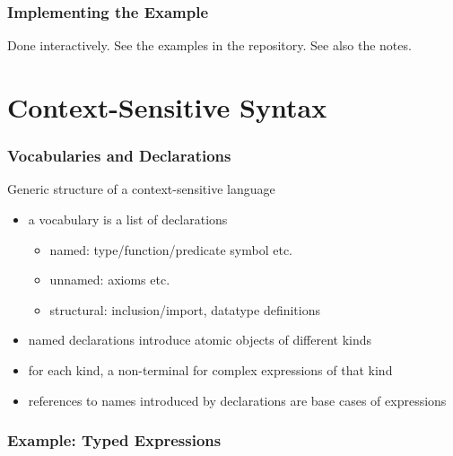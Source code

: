 \begin{frame}\frametitle{Implementing the Example}
Done interactively. See the examples in the repository. See also the notes.
\end{frame}

\section{Context-Sensitive Syntax}

\begin{frame}\frametitle{Vocabularies and Declarations}
Generic structure of a context-sensitive language
\begin{itemize}
 \item a vocabulary is a list of declarations
  \begin{itemize}
  \item named: type/function/predicate symbol etc.
  \item unnamed: axioms etc.
  \item structural: inclusion/import, datatype definitions
  \end{itemize}
 \item named declarations introduce atomic objects of different kinds
 \item for each kind, a non-terminal for complex expressions of that kind
 \item references to names introduced by declarations are base cases of expressions
\end{itemize}
\end{frame}

\begin{frame}\frametitle{Example: Typed Expressions}
\small
\begin{commgrammar}
\\
\\
\\
\\
\\
\\
\\
\\
\\
\\
\\
\\
\\
\end{commgrammar}
\end{frame}

